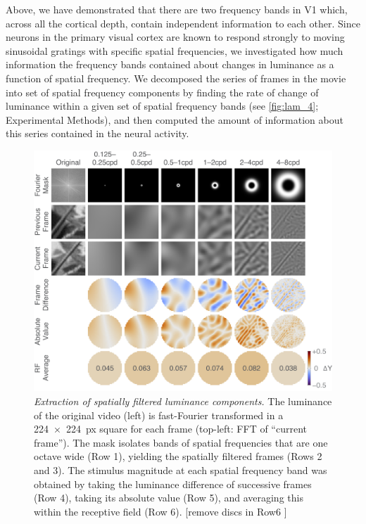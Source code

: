 Above, we have demonstrated that there are two frequency bands in \ac{V1} which, across all the cortical depth, contain independent information to each other.
Since neurons in the primary visual cortex are known to respond strongly to moving sinusoidal gratings with specific spatial frequencies, we investigated how much information the frequency bands contained about changes in luminance as a function of spatial frequency.
We decomposed the series of frames in the movie into set of spatial frequency components by finding the rate of change of luminance within a given set of spatial frequency bands (see \autoref{fig:lam_4}; Experimental Methods), and then computed the amount of information about this series contained in the neural activity.

\begin{figure}[htbp]
\centering \includegraphics[width=\columnwidth]{paperfigs/fig4}
%
\caption{%
\textit{Extraction of spatially filtered luminance components.}
The luminance of the original video (left) is fast-Fourier transformed in a \SI{224x224}{px} square for each frame (top-left: \ac{FFT} of  ``current frame'').
The mask isolates bands of spatial frequencies that are one octave wide (Row 1), yielding the spatially filtered frames (Rows 2 and 3).
The stimulus magnitude at each spatial frequency band was obtained by taking the luminance difference of successive frames (Row 4), taking its absolute value (Row 5), and averaging this within the receptive field (Row 6). [remove discs in Row6 ]
}%
\label{fig:lam_4}
%
\end{figure}


